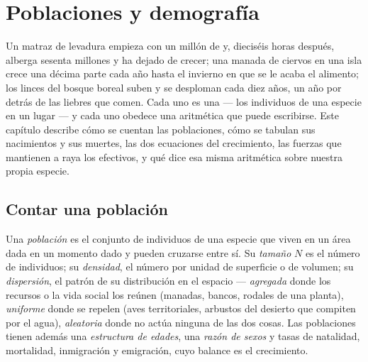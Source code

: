 \chapter{Poblaciones y demografía}\label{ch:b1:populations}

Un matraz de levadura empieza con un millón de  y, dieciséis horas
después, alberga sesenta millones y ha dejado de crecer; una manada de
ciervos en una isla crece una décima parte cada año hasta el invierno en que
se le acaba el alimento; los linces del bosque boreal suben y se desploman
cada diez años, un año por detrás de las liebres que comen. Cada uno es una
\emph{} --- los individuos de una especie en un lugar --- y cada
uno obedece una aritmética que puede escribirse. Este capítulo describe cómo
se cuentan las poblaciones, cómo se tabulan sus nacimientos y sus muertes,
las dos ecuaciones del crecimiento, las fuerzas que mantienen a raya los
efectivos, y qué dice esa misma aritmética sobre nuestra propia especie.

\section{Contar una población}

\begin{definition}\label{def:b1:populations:population}
Una \emph{población} es el conjunto de individuos de una especie que viven
en un área dada en un momento dado y pueden cruzarse entre sí. Su
\emph{tamaño} $N$ es el número de individuos; su \emph{densidad}, el número
por unidad de superficie o de volumen; su \emph{dispersión}, el patrón de su
distribución en el espacio --- \emph{agregada} donde los recursos o la vida
social los reúnen (manadas, bancos, rodales de una planta), \emph{uniforme}
donde se repelen (aves territoriales, arbustos del desierto que compiten por
el agua), \emph{aleatoria} donde no actúa ninguna de las dos cosas. Las
poblaciones tienen además una \emph{estructura de edades}, una \emph{razón
de sexos} y tasas de natalidad, mortalidad, inmigración y emigración, cuyo
balance es el crecimiento.
\end{definition}

